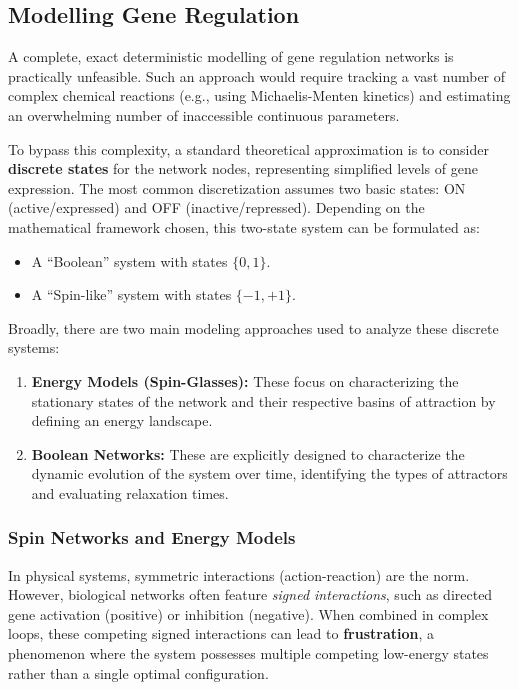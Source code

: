 \subsection{Modelling Gene Regulation}
\label{subsec:modelling_gene_regulation}

A complete, exact deterministic modelling of gene regulation networks is practically unfeasible. Such an approach would require tracking a vast number of complex chemical reactions (e.g., using Michaelis-Menten kinetics) and estimating an overwhelming number of inaccessible continuous parameters.

To bypass this complexity, a standard theoretical approximation is to consider \textbf{discrete states} for the network nodes, representing simplified levels of gene expression. The most common discretization assumes two basic states: ON (active/expressed) and OFF (inactive/repressed). Depending on the mathematical framework chosen, this two-state system can be formulated as:
\begin{itemize}
    \item A ``Boolean'' system with states \(\{0, 1\}\).
    \item A ``Spin-like'' system with states \(\{-1, +1\}\).
\end{itemize}

Broadly, there are two main modeling approaches used to analyze these discrete systems:
\begin{enumerate}
    \item \textbf{Energy Models (Spin-Glasses):} These focus on characterizing the stationary states of the network and their respective basins of attraction by defining an energy landscape.
    \item \textbf{Boolean Networks:} These are explicitly designed to characterize the dynamic evolution of the system over time, identifying the types of attractors and evaluating relaxation times.
\end{enumerate}

\subsubsection{Spin Networks and Energy Models}
\label{subsubsec:spin_networks}

In physical systems, symmetric interactions (action-reaction) are the norm. However, biological networks often feature \textit{signed interactions}, such as directed gene activation (positive) or inhibition (negative). When combined in complex loops, these competing signed interactions can lead to \textbf{frustration}, a phenomenon where the system possesses multiple competing low-energy states rather than a single optimal configuration.

